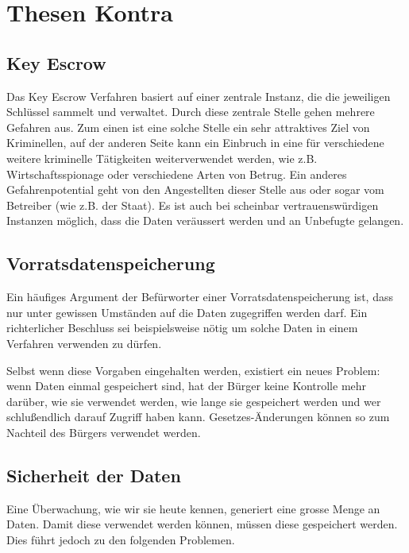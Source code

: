 %
%

\section*{Thesen Kontra}

\subsection*{Key Escrow}
Das Key Escrow Verfahren basiert auf einer zentrale Instanz,
die die jeweiligen Schlüssel sammelt und verwaltet.
Durch diese zentrale Stelle gehen mehrere Gefahren aus. Zum einen ist eine
solche Stelle ein sehr attraktives Ziel von Kriminellen, auf der
anderen Seite kann ein Einbruch in eine für verschiedene weitere
kriminelle Tätigkeiten weiterverwendet werden, wie z.B.
Wirtschaftsspionage oder verschiedene Arten von Betrug.
Ein anderes Gefahrenpotential geht von den Angestellten dieser Stelle aus oder
sogar vom Betreiber (wie z.B. der Staat).
Es ist auch bei scheinbar vertrauenswürdigen Instanzen möglich,
dass die Daten veräussert werden und an Unbefugte gelangen.

\subsection*{Vorratsdatenspeicherung}
Ein häufiges Argument der Befürworter einer Vorratsdatenspeicherung ist,
dass nur unter gewissen Umständen auf die Daten zugegriffen werden darf.
Ein richterlicher Beschluss sei beispielsweise nötig um solche Daten
in einem Verfahren verwenden zu dürfen.

Selbst wenn diese Vorgaben eingehalten werden, existiert ein
neues Problem: wenn Daten einmal gespeichert sind, hat der 
Bürger keine Kontrolle mehr darüber, wie sie verwendet werden,
wie lange sie gespeichert werden und wer schlußendlich darauf
Zugriff haben kann. Gesetzes-Änderungen können so zum Nachteil
des Bürgers verwendet werden.

\subsection*{Sicherheit der Daten}
Eine Überwachung, wie wir sie heute kennen, generiert eine grosse Menge an Daten.
Damit diese verwendet werden können, müssen diese gespeichert werden.
Dies führt jedoch zu den folgenden Problemen.

